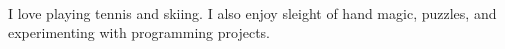 \documentclass[9pt]{resume}
\begin{document}
    \vspace{0.4cm}
        
        

    \vspace{-0.2cm}\\
        I love playing tennis and skiing. I also enjoy sleight of hand magic, puzzles, and experimenting with programming projects. 
\end{document}
